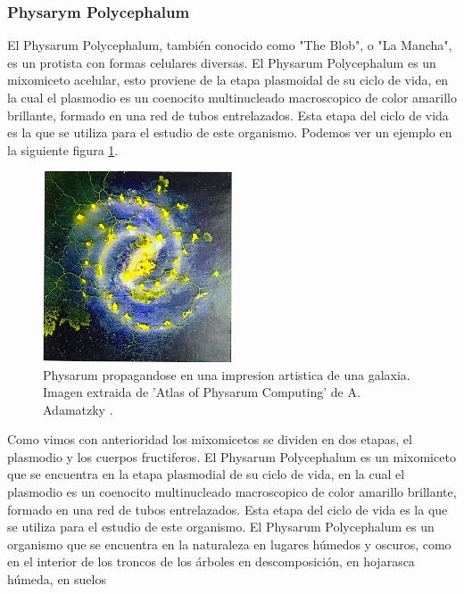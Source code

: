 \subsubsection{Physarym Polycephalum}
    El Physarum Polycephalum, tambi\'en conocido como "The Blob", 
        o "La Mancha", es un protista con formas celulares diversas. El Physarum Polycephalum
        es un mixomiceto acelular, esto proviene de la etapa plasmoidal de su ciclo de vida,
        en la cual el plasmodio es un coenocito multinucleado macroscopico de color amarillo 
        brillante, formado en una red de tubos entrelazados. Esta etapa del ciclo de vida es 
        la que se utiliza para el estudio de este organismo.\cite{Dee1960} Podemos ver un ejemplo
        en la siguiente figura \ref{fig:PhysarumPolycephalum01}.
    \begin{figure}[h]  
        \centering
        \includegraphics[width=0.5\textwidth]{./images/marco_teorico/Physarum/PhyrasumPolycephalum01.png}
        \caption{Physarum propagandose en una impresion artistica de una galaxia. Imagen extraida de 'Atlas of Physarum Computing' de A. Adamatzky \cite{Adamatzky2014}.}
        \label{fig:PhysarumPolycephalum01}
    \end{figure} 
    \vskip 0.5cm
    Como vimos con anterioridad los mixomicetos se dividen en dos etapas, el plasmodio y los cuerpos fructiferos.
        El Physarum Polycephalum es un mixomiceto que se encuentra en la etapa plasmodial de su ciclo de vida, 
        en la cual el plasmodio es un coenocito multinucleado macroscopico de color amarillo brillante, formado en una red de tubos entrelazados.
        Esta etapa del ciclo de vida es la que se utiliza para el estudio de este organismo.\cite{Dee1960}
    \vskip 0.5cm
    El Physarum Polycephalum es un organismo que se encuentra en la naturaleza en lugares h\'umedos y oscuros, 
        como en el interior de los troncos de los \'arboles en descomposici\'on, en hojarasca h\'umeda, en suelos 
